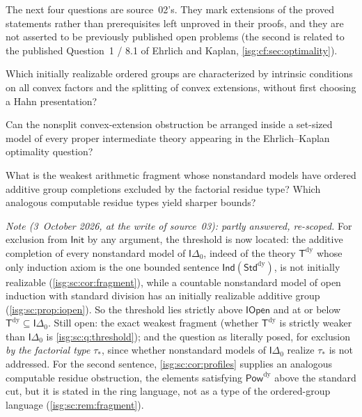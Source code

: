 \documentclass[11pt]{article}
\theoremstyle{definition}
\theoremstyle{remark}
\newcommand{\IR}{\mathsf{Init}}
\newcommand{\PowDy}{\mathsf{Pow}^{\mathrm{dy}}}
\newcommand{\StdDy}{\mathsf{Std}^{\mathrm{dy}}}
\newcommand{\Tdy}{\mathsf{T}^{\mathrm{dy}}}
\newcommand{\Ind}{\mathsf{Ind}}
\newcommand{\Iopen}{\mathsf{IOpen}}
\newcommand{\Idelta}{\mathsf{I}\Delta_0}
\begin{document}
The next four questions are source~02's. They mark extensions of the
proved statements rather than prerequisites left unproved in their
proofs, and they are not asserted to be previously published open
problems (the second is related to the published Question~1 / 8.1 of
Ehrlich and Kaplan, \cref{isg:cf:sec:optimality}).

\begin{question}\label{isg:cf:q:intrinsic}
Which initially realizable ordered groups are characterized by intrinsic
conditions on all convex factors and the splitting of convex extensions,
without first choosing a Hahn presentation?
\end{question}

\begin{question}\label{isg:cf:q:intermediate}
Can the nonsplit convex-extension obstruction be arranged inside a
set-sized model of every proper intermediate theory appearing in the
Ehrlich--Kaplan optimality question?
\end{question}

\begin{question}\label{isg:cf:q:fragment}
What is the weakest arithmetic fragment whose nonstandard models have
ordered additive group completions excluded by the factorial residue
type? Which analogous computable residue types yield sharper bounds?
\end{question}
\emph{Note (3~October 2026, at the write of source~03): partly answered,
re-scoped.} For exclusion from $\IR$ by any argument, the threshold is now
located: the additive completion of every nonstandard model of $\Idelta$,
indeed of the theory $\Tdy$ whose only induction axiom is the one bounded
sentence $\Ind(\StdDy)$, is not initially realizable
(\cref{isg:sc:cor:fragment}), while a countable nonstandard model of open
induction with standard division has an initially realizable additive
group (\cref{isg:sc:prop:iopen}). So the threshold lies strictly above
$\Iopen$ and at or below $\Tdy\subseteq\Idelta$. Still open: the exact
weakest fragment (whether $\Tdy$ is strictly weaker than $\Idelta$ is
\cref{isg:sc:q:threshold}); and the question as literally posed, for
exclusion \emph{by the factorial type} $\tau_*$, since whether nonstandard
models of $\Idelta$ realize $\tau_*$ is not addressed. For the second
sentence, \cref{isg:sc:cor:profiles} supplies an analogous computable
residue obstruction, the elements satisfying $\PowDy$ above the standard
cut, but it is stated in the ring language, not as a type of the
ordered-group language (\cref{isg:sc:rem:fragment}).
\end{document}
